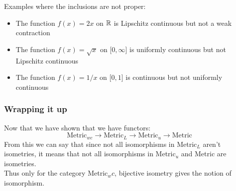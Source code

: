 \begin{frame}
    Examples where the inclusions are not proper:
    \begin{itemize}
        \item The function \(f(x)=2x\) on \(\mathbb{R}\) is Lipschitz continuous but not a weak contraction
        \item The function \(f(x)=\sqrt{x}\) on [\(0,\infty\)] is uniformly continuous but not Lipschitz continuous
        \item The function \(f(x)=1/x\) on [\(0,1\)] is continuous but not uniformly continuous
    \end{itemize}
\end{frame}

\begin{frame}
    \frametitle{Wrapping it up}
    Now that we have shown that we have functors:
    \begin{equation*}
        \text{Metric}_{wc} \rightarrow \text{Metric}_L \rightarrow \text{Metric}_u \rightarrow \text{Metric}
    \end{equation*}
    From this we can say that since not all isomorphisms in Metric\(_{L}\) aren't isometries, 
    \pause
    it means that not all isomorphisms in Metric\(_u\) and Metric are isometries.\\
    Thus only for the category Metric\(_wc\), bijective isometry gives the notion of isomorphism.

\end{frame}